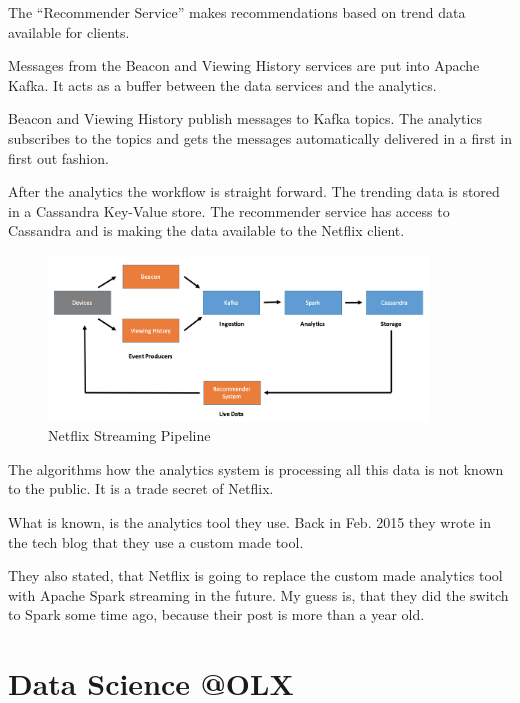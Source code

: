 \documentclass[12pt, numbers=noenddot]{scrreprt} %
\begin{document}
The “Recommender Service” makes recommendations based on trend data available for clients.

Messages from the Beacon and Viewing History services are put into Apache Kafka.
It acts as a buffer between the data services and the analytics.

Beacon and Viewing History publish messages to Kafka topics. The analytics subscribes to the topics and gets the messages automatically delivered in a first in first out fashion.

After the analytics the workflow is straight forward. The trending data is stored in a Cassandra Key-Value store. The recommender service has access to Cassandra and is making the data available to the Netflix client.

\begin{figure}[htbp]
  \centering
     \includegraphics[width=0.9\textwidth]{images/Netflix-Streaming-Pipeline}
  \caption{Netflix Streaming Pipeline}
  \label{fig:Bild1}
\end{figure}


The algorithms how the analytics system is processing all this data is not known to the public. It is a trade secret of Netflix.

What is known, is the analytics tool they use. Back in Feb. 2015 they wrote in the tech blog that they use a custom made tool.

They also stated, that Netflix is going to replace the custom made analytics tool with Apache Spark streaming in the future. My guess is, that they did the switch to Spark some time ago, because their post is more than a year old.

\section{Data Science @OLX}
\end{document}
